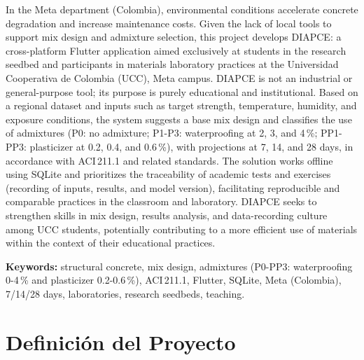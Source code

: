 \documentclass[12pt, letterpaper]{article}
\begin{document}
In the Meta department (Colombia), environmental conditions accelerate concrete degradation and increase maintenance costs. Given the lack of local tools to support mix design and admixture selection, this project develops DIAPCE: a cross-platform Flutter application aimed exclusively at students in the research seedbed and participants in materials laboratory practices at the Universidad Cooperativa de Colombia (UCC), Meta campus. DIAPCE is not an industrial or general-purpose tool; its purpose is purely educational and institutional. Based on a regional dataset and inputs such as target strength, temperature, humidity, and exposure conditions, the system suggests a base mix design and classifies the use of admixtures (P0: no admixture; P1-P3: waterproofing at 2, 3, and 4\,\%; PP1-PP3: plasticizer at 0.2, 0.4, and 0.6\,\%), with projections at 7, 14, and 28 days, in accordance with ACI\,211.1 and related standards. The solution works offline using SQLite and prioritizes the traceability of academic tests and exercises (recording of inputs, results, and model version), facilitating reproducible and comparable practices in the classroom and laboratory. DIAPCE seeks to strengthen skills in mix design, results analysis, and data-recording culture among UCC students, potentially contributing to a more efficient use of materials within the context of their educational practices.

\vspace{0.5em}
\noindent\textbf{Keywords:} structural concrete, mix design, admixtures (P0-PP3: waterproofing 0-4\,\% and plasticizer 0.2-0.6\,\%), ACI\,211.1, Flutter, SQLite, Meta (Colombia), 7/14/28 days, laboratories, research seedbeds, teaching.

\newpage
\tableofcontents
\newpage
\listoftables
{}
\newpage
\listoffigures
{}

\newpage
{}
\setcounter{page}{1}

\section{Definición del Proyecto}
\end{document}
